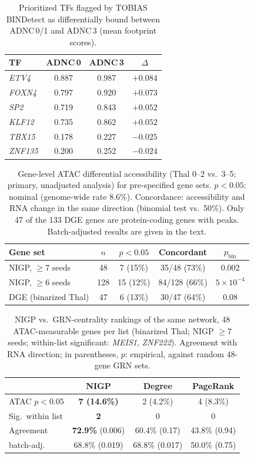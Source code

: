 \documentclass[10pt,twocolumn,letterpaper]{article}
\newcommand{\gene}[1]{\textit{#1}}
\begin{document}
\begin{table}[!htb]
\centering\small
\caption{Prioritized TFs flagged by TOBIAS BINDetect as differentially bound between ADNC\,0/1 and ADNC\,3 (mean footprint scores).}
\label{tab:atac}
\begin{tabular}{lccc}
\toprule
TF & ADNC\,0 & ADNC\,3 & $\Delta$ \\
\midrule
\gene{ETV4} & 0.887 & 0.987 & $+0.084$ \\
\gene{FOXN4} & 0.797 & 0.920 & $+0.073$ \\
\gene{SP2} & 0.719 & 0.843 & $+0.052$ \\
\gene{KLF12} & 0.735 & 0.862 & $+0.052$ \\
\gene{TBX15} & 0.178 & 0.227 & $-0.025$ \\
\gene{ZNF135} & 0.200 & 0.252 & $-0.024$ \\
\bottomrule
\end{tabular}
\end{table}

\begin{table}[!htb]
\centering\small
\caption{Gene-level ATAC differential accessibility (Thal 0--2 vs.\ 3--5; primary, unadjusted analysis) for pre-specified gene sets. $p<0.05$: nominal (genome-wide rate 8.6\%). Concordance: accessibility and RNA change in the same direction (binomial test vs.\ 50\%). Only 47 of the 133 DGE genes are protein-coding genes with peaks. Batch-adjusted results are given in the text.}
\label{tab:atacsets}
\setlength{\tabcolsep}{2.5pt}\footnotesize
\begin{tabular}{lcccc}
\toprule
Gene set & $n$ & $p<0.05$ & Concordant & $p_{\text{bin}}$ \\
\midrule
NIGP, $\geq$7 seeds & 48 & 7 (15\%) & 35/48 (73\%) & 0.002 \\
NIGP, $\geq$6 seeds & 128 & 15 (12\%) & 84/128 (66\%) & $5\times10^{-4}$ \\
DGE (binarized Thal) & 47 & 6 (13\%) & 30/47 (64\%) & 0.08 \\
\bottomrule
\end{tabular}
\end{table}

\begin{table}[!htb]
\centering\small
\caption{NIGP vs.\ GRN-centrality rankings of the same network, 48 ATAC-measurable genes per list (binarized Thal; NIGP $\geq$7 seeds; within-list significant: \gene{MEIS1}, \gene{ZNF222}). Agreement with RNA direction; in parentheses, $p$: empirical, against random 48-gene GRN sets.}
\label{tab:central}
\setlength{\tabcolsep}{2pt}\footnotesize
\begin{tabular}{lccc}
\toprule
 & NIGP & Degree & PageRank \\
\midrule
ATAC $p<0.05$ & \textbf{7 (14.6\%)} & 2 (4.2\%) & 4 (8.3\%) \\
Sig.\ within list & \textbf{2} & 0 & 0 \\
Agreement & \textbf{72.9\%} (0.006) & 60.4\% (0.17) & 43.8\% (0.94) \\
\quad batch-adj. & 68.8\% (0.019) & 68.8\% (0.017) & 50.0\% (0.75) \\
\bottomrule
\end{tabular}
\end{table}
\end{document}
